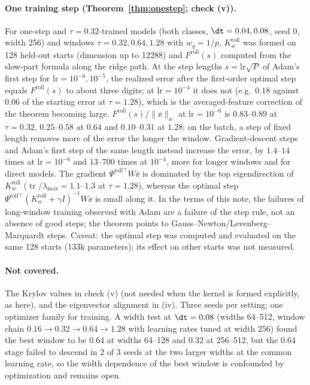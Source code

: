 \paragraph{One training step (Theorem~\ref{thm:onestep}; check (v)).}
For one-step and $\tau=0.32$-trained models (both classes, $\dt = 0.04, 0.08$, seed 0, width 256) and windows $\tau = 0.32, 0.64, 1.28$ with $w_q = 1/p$, $K^{\mathrm{roll}}_w$ was formed on 128 held-out starts (dimension up to 12288) and $F^{\mathrm{roll}}(s)$ computed from the slow-part formula along the ridge path.
At the step lengths $s = \mathrm{lr}\sqrt{P}$ of Adam's first step for $\mathrm{lr} = 10^{-6}, 10^{-5}$, the realized error after the first-order optimal step equals $F^{\mathrm{roll}}(s)$ to about three digits; at $\mathrm{lr} = 10^{-4}$ it does not (e.g.\ $0.18$ against $0.06$ of the starting error at $\tau = 1.28$), which is the averaged-feature correction of the theorem becoming large.
$F^{\mathrm{roll}}(s)/\|\ee\|_w$ at $\mathrm{lr} = 10^{-6}$ is $0.83$--$0.89$ at $\tau = 0.32$, $0.25$--$0.58$ at $0.64$ and $0.10$--$0.31$ at $1.28$: on the batch, a step of fixed length removes more of the error the longer the window.
Gradient-descent steps and Adam's first step of the same length instead increase the error, by $1.4$--$14$ times at $\mathrm{lr} = 10^{-6}$ and $13$--$700$ times at $10^{-4}$, more for longer windows and for direct models.
The gradient $\Psi^{\mathrm{roll}\top}W\ee$ is dominated by the top eigendirection of $K^{\mathrm{roll}}_w$ ($\operatorname{tr}/\lambda_{\max} = 1.1$--$1.3$ at $\tau = 1.28$), whereas the optimal step $\Psi^{\mathrm{roll}\top}(K^{\mathrm{roll}}_w + \gamma I)^{-1}W\ee$ is small along it.
In the terms of this note, the failures of long-window training observed with Adam are a failure of the step rule, not an absence of good steps; the theorem points to Gauss--Newton/Levenberg--Marquardt steps.
Caveat: the optimal step was computed and evaluated on the same 128 starts (133k parameters); its effect on other starts was not measured.

\paragraph{Not covered.}
The Krylov values in check (v) (not needed when the kernel is formed explicitly, as here), and the eigenvector alignment in (iv).
Three seeds per setting; one optimizer family for training. A width test at $\dt = 0.08$ (widths 64--512, window chain $0.16\to0.32\to0.64\to1.28$ with learning rates tuned at width 256) found the best window to be $0.64$ at widths 64--128 and $0.32$ at 256--512, but the $0.64$ stage failed to descend in 2 of 3 seeds at the two larger widths at the common learning rate, so the width dependence of the best window is confounded by optimization and remains open.
